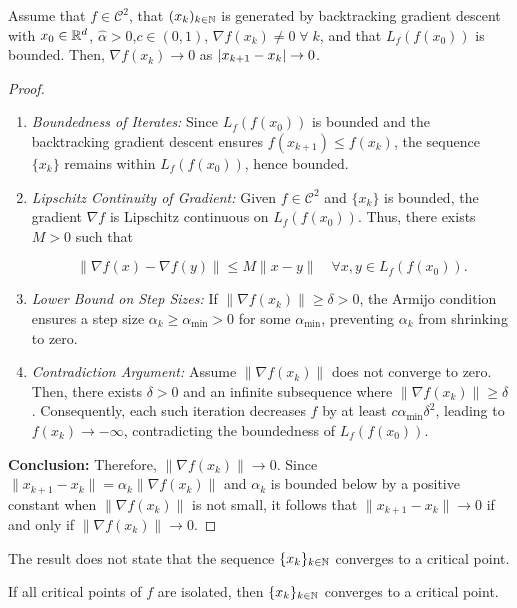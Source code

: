 \begin{theorem}{}{}
    Assume that $f \in \mathcal{C}^2$, that $(x_k)_{k \in \mathbb{N}}$
    is generated by backtracking gradient descent with
    $x_0 \in \mathbb{R}^d$, $\hat{\alpha} > 0$,$c \in (0, 1)$, $\nabla f(x_k) \neq 0 \; \forall \; k$, and that
    $L_f(f(x_0))$ is bounded. Then, $\nabla f(x_k) \to 0$ as $\lvert x_{k+1} - x_k\rvert \to 0$.
\end{theorem}

\begin{proof}{}{}
    \begin{enumerate}
        \item \textit{Boundedness of Iterates:} Since $L_f(f(x_0))$ is bounded and the backtracking gradient descent ensures $f(x_{k+1}) \leq f(x_k)$, the sequence $\{x_k\}$ remains within $L_f(f(x_0))$, hence bounded.
        \item \textit{Lipschitz Continuity of Gradient:} Given $f \in \mathcal{C}^2$ and $\{x_k\}$ is bounded, the gradient $\nabla f$ is Lipschitz continuous on $L_f(f(x_0))$. Thus, there exists $M > 0$ such that

              \[
                  \|\nabla f(x) - \nabla f(y)\| \leq M \|x - y\| \quad \forall x, y \in L_f(f(x_0)).
              \]

        \item \textit{Lower Bound on Step Sizes:} If $\|\nabla f(x_k)\| \geq \delta > 0$, the Armijo condition ensures a step size $\alpha_k \geq \alpha_{\min} > 0$ for some $\alpha_{\min}$, preventing $\alpha_k$ from shrinking to zero.
        \item \textit{Contradiction Argument:} Assume $\|\nabla f(x_k)\|$ does not converge to zero. Then, there exists $\delta > 0$ and an infinite subsequence where $\|\nabla f(x_k)\| \geq \delta$. Consequently, each such iteration decreases $f$ by at least $c \alpha_{\min} \delta^2$, leading to $f(x_k) \to -\infty$, contradicting the boundedness of $L_f(f(x_0))$.
    \end{enumerate}

    \textbf{Conclusion:} Therefore, $\|\nabla f(x_k)\| \to 0$. Since $\|x_{k+1} - x_k\| = \alpha_k \|\nabla f(x_k)\|$ and $\alpha_k$ is bounded below by a positive constant when $\|\nabla f(x_k)\|$ is not small, it follows that $\|x_{k+1} - x_k\| \to 0$ if and only if $\|\nabla f(x_k)\| \to 0$.

\end{proof}

\begin{remark}{}{}

    The result does not state that the sequence $\{x_k\}_{k \in \mathbb{N}}$ converges to a critical point.

    If all critical points of $f$ are isolated, then $\{x_k\}_{k \in \mathbb{N}}$ converges to a critical point.
\end{remark}

